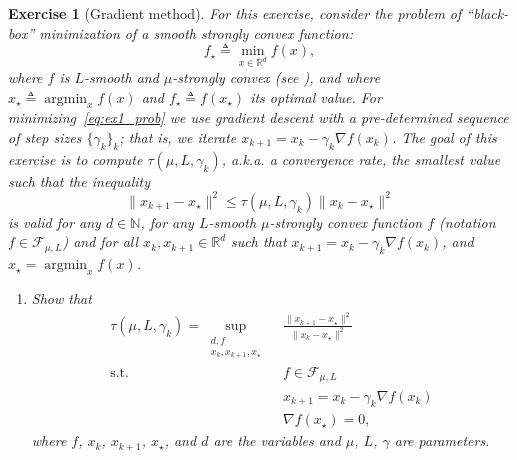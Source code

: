 \documentclass[11pt,a4paper]{article}
\DeclareMathOperator*{\argmin}{argmin}
\newtheorem{exercise}{Exercise}
\begin{document}
	\begin{exercise}[Gradient method] For this exercise, consider the problem of ``black-box'' minimization of a smooth strongly convex function:
	\begin{equation}\label{eq:ex1_prob}
	f_\star \triangleq \min_{x\in\mathbb{R}^d} f(x),
	\end{equation}
	where $f$ is $L$-smooth and $\mu$-strongly convex (see ), and where $x_\star\triangleq \argmin_{x} f(x)$ and $f_\star\triangleq f(x_\star)$ its optimal value. For minimizing~\eqref{eq:ex1_prob} we use gradient descent with a pre-determined sequence of step sizes $\{\gamma_k\}_k$; that is, we iterate $x_{k+1}=x_k-\gamma_k \nabla f(x_k)$.
	The goal of this exercise is to compute $\tau(\mu,L,\gamma_k)$, a.k.a.\! a convergence rate, the smallest value such that the inequality
	\[ \|x_{k+1}-x_\star\|^2 \leqslant \tau(\mu,L,\gamma_k) \|x_k-x_\star\|^2\]
	is valid for any $d\in\mathbb{N}$, for any $L$-smooth $\mu$-strongly convex function $f$ (notation $f\in\mathcal{F}_{\mu,L}$) and for all $x_k,x_{k+1}\in\mathbb{R}^d$ such that $x_{k+1}=x_k-\gamma_k \nabla f(x_k)$, and $x_\star=\argmin_x f(x)$. 
	\begin{enumerate}
	\item Show that 
	\begin{align*}
		\tau(\mu,L,\gamma_k)= \sup_{\substack{d,f\\x_k,x_{k+1},x_\star}} \ &\frac{\|x_{k+1}-x_\star\|^2}{\|x_k-x_\star\|^2}\\
		\text{s.t. } & f\in\mathcal{F}_{\mu,L} \\
		&x_{k+1}=x_k-\gamma_k  \nabla f(x_k)\\
		&\nabla f(x_\star)=0,
		\end{align*} where $f$, $x_k$, $x_{k+1}$, $x_\star$, and $d$ are the variables and $\mu$, $L$, $\gamma$ are parameters.
		

\end{enumerate}
\end{exercise}
\end{document}
